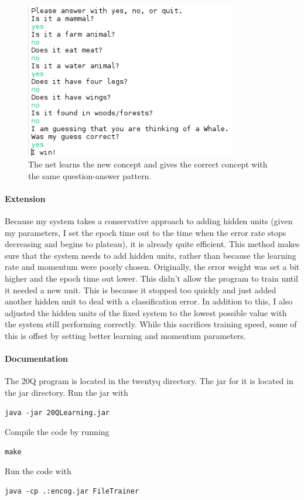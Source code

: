 \documentclass[12pt]{article}
\begin{document}
\begin{figure}
\centering
\includegraphics[width=350]{learnedconcept.png}
\caption{The net learns the new concept and gives the correct concept with the same question-answer pattern.}
\end{figure}

\paragraph*{Extension}
Because my system takes a conservative approach to adding hidden units (given my parameters, I set the epoch time out to the time when the error rate stops decreasing and begins to plateau), it is already quite efficient. This method makes sure that the system needs to add hidden units, rather than because the learning rate and momentum were poorly chosen. Originally, the error weight was set a bit higher and the epoch time out lower. This didn't allow the program to train until it needed a new unit. This is because it stopped too quickly and just added another hidden unit to deal with a classification error. In addition to this, I also adjusted the hidden units of the fixed system to the lowest possible value with the system still performing correctly. While this sacrifices training speed, some of this is offset by setting better learning and momentum parameters.

\paragraph*{Documentation}
The 20Q program is located in the twentyq directory. The jar for it is located in the jar directory.
Run the jar with
\begin{verbatim}
java -jar 20QLearning.jar
\end{verbatim}
Compile the code by running
\begin{verbatim}
make
\end{verbatim}
Run the code with
\begin{verbatim}
java -cp .:encog.jar FileTrainer
\end{verbatim}
\end{document}
